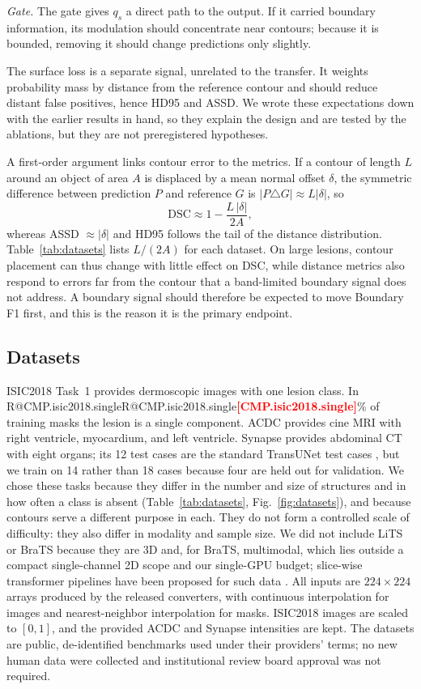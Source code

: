 \documentclass[fleqn,10pt,lineno]{wlpeerj}
\makeatletter
\newcommand{\R}[1]{\ifcsname R@#1\endcsname\csname R@#1\endcsname\else\textbf{\textcolor{red}{[#1]}}\fi}
\makeatother
\begin{document}
\emph{Gate.} The gate gives $q_s$ a direct path to the output. If it carried boundary information, its modulation should concentrate near contours; because it is bounded, removing it should change predictions only slightly.

The surface loss is a separate signal, unrelated to the transfer. It weights probability mass by distance from the reference contour and should reduce distant false positives, hence HD95 and ASSD. We wrote these expectations down with the earlier results in hand, so they explain the design and are tested by the ablations, but they are not preregistered hypotheses.

A first-order argument links contour error to the metrics. If a contour of length $L$ around an object of area $A$ is displaced by a mean normal offset $\delta$, the symmetric difference between prediction $P$ and reference $G$ is $|P\triangle G|\approx L|\delta|$, so
\begin{equation}
\mathrm{DSC}\approx1-\frac{L\,|\delta|}{2A},
\label{eq:firstorder}
\end{equation}
whereas ASSD $\approx|\delta|$ and HD95 follows the tail of the distance distribution. Table~\ref{tab:datasets} lists $L/(2A)$ for each dataset. On large lesions, contour placement can thus change with little effect on DSC, while distance metrics also respond to errors far from the contour that a band-limited boundary signal does not address. A boundary signal should therefore be expected to move Boundary F1 first, and this is the reason it is the primary endpoint.

\subsection*{Datasets}
ISIC2018 Task~1 \citep{Codella2019Skin} provides dermoscopic images with one lesion class. In \R{CMP.isic2018.single}\% of training masks the lesion is a single component. ACDC \citep{Bernard2018Deep} provides cine MRI with right ventricle, myocardium, and left ventricle. Synapse \citep{Landman2015MICCAI} provides abdominal CT with eight organs; its 12 test cases are the standard TransUNet test cases \citep{Chen2021TransUNetArxiv}, but we train on 14 rather than 18 cases because four are held out for validation. We chose these tasks because they differ in the number and size of structures and in how often a class is absent (Table~\ref{tab:datasets}, Fig.~\ref{fig:datasets}), and because contours serve a different purpose in each. They do not form a controlled scale of difficulty: they also differ in modality and sample size. We did not include LiTS or BraTS because they are 3D and, for BraTS, multimodal, which lies outside a compact single-channel 2D scope and our single-GPU budget; slice-wise transformer pipelines have been proposed for such data \citep{Raj2026ViTSwinUNet}. All inputs are $224\times224$ arrays produced by the released converters, with continuous interpolation for images and nearest-neighbor interpolation for masks. ISIC2018 images are scaled to $[0,1]$, and the provided ACDC and Synapse intensities are kept. The datasets are public, de-identified benchmarks used under their providers' terms; no new human data were collected and institutional review board approval was not required.
\end{document}
